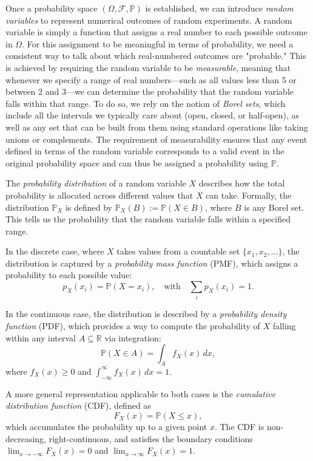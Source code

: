 \documentclass[10pt,twocolumn,article]{memoir}
\begin{document}
Once a probability space $(\Omega, \mathcal{F}, \mathbb{P})$ is established, we can introduce \textit{random variables} to represent numerical outcomes of random experiments. A random variable is simply a function that assigns a real number to each possible outcome in $\Omega$. For this assignment to be meaningful in terms of probability, we need a consistent way to talk about which real-numbered outcomes are "probable." This is achieved by requiring the random variable to be \textit{measurable}, meaning that whenever we specify a range of real numbers—such as all values less than 5 or between 2 and 3—we can determine the probability that the random variable falls within that range. To do so, we rely on the notion of \textit{Borel sets}, which include all the intervals we typically care about (open, closed, or half-open), as well as any set that can be built from them using standard operations like taking unions or complements. The requirement of measurability ensures that any event defined in terms of the random variable corresponds to a valid event in the original probability space and can thus be assigned a probability using $\mathbb{P}$.

The \textit{probability distribution} of a random variable $X$ describes how the total probability is allocated across different values that $X$ can take. Formally, the distribution $\mathbb{P}_X$ is defined by $\mathbb{P}_X(B) := \mathbb{P}(X \in B)$, where $B$ is any Borel set. This tells us the probability that the random variable falls within a specified range.

In the discrete case, where $X$ takes values from a countable set $\{x_1, x_2, \dots\}$, the distribution is captured by a \textit{probability mass function} (PMF), which assigns a probability to each possible value:
\begin{equation}
p_X(x_i) = \mathbb{P}(X = x_i), \quad \text{with} \quad \sum_{i} p_X(x_i) = 1.
\end{equation}

In the continuous case, the distribution is described by a \textit{probability density function} (PDF), which provides a way to compute the probability of $X$ falling within any interval $A \subseteq \mathbb{R}$ via integration:
\begin{equation}
\mathbb{P}(X \in A) = \int_A f_X(x)\,dx,
\end{equation}
where $f_X(x) \geq 0$ and $\int_{-\infty}^{\infty} f_X(x)\,dx = 1$.

A more general representation applicable to both cases is the \textit{cumulative distribution function} (CDF), defined as
\begin{equation}
F_X(x) = \mathbb{P}(X \leq x),
\end{equation}
which accumulates the probability up to a given point $x$. The CDF is non-decreasing, right-continuous, and satisfies the boundary conditions $\lim_{x \to -\infty} F_X(x) = 0$ and $\lim_{x \to \infty} F_X(x) = 1$.
\end{document}
